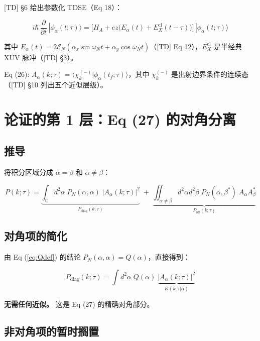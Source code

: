 \documentclass[12pt,a4paper]{ctexart}
\begin{document}
[TD] §6 给出参数化 TDSE（Eq 18）：

\begin{equation}\label{eq:paramTDSE}
i\hbar\,\frac{\partial}{\partial t}\,|\phi_\alpha(t;\tau)\rangle
= \bigl[H_A + ez\bigl(E_\alpha(t) + E_X^{\text{cl}}(t-\tau)\bigr)\bigr]\,|\phi_\alpha(t;\tau)\rangle
\end{equation}

其中 $E_\alpha(t) = 2\mathcal{E}_N(\alpha_x\sin\omega_N t + \alpha_y\cos\omega_N t)$（[TD] Eq 12），$E_X^{\text{cl}}$ 是半经典 XUV 脉冲（[TD] §3）。

Eq (26): $A_\alpha(k;\tau) = \langle\chi_k^{(-)}|\phi_\alpha(t_f;\tau)\rangle$，其中 $\chi_k^{(-)}$ 是出射边界条件的连续态（[TD] §10 列出五个近似层级）。

\section{论证的第 1 层：Eq (27) 的对角分离}

\subsection{推导}

将积分区域分成 $\alpha=\beta$ 和 $\alpha\neq\beta$：

\begin{equation}\label{eq:split}
P(k;\tau) = \underbrace{\int_{\mathbb{C}} d^2\alpha\;P_N(\alpha,\alpha)\;|A_\alpha(k;\tau)|^2}_{P_{\text{diag}}(k;\tau)}
\;+\;
\underbrace{\iint_{\alpha\neq\beta} d^2\alpha d^2\beta\;P_N(\alpha,\beta^*)\;A_\alpha A_\beta^*}_{P_{\text{off}}(k;\tau)}
\end{equation}

\subsection{对角项的简化}

由 Eq (\ref{eq:Qdef}) 的结论 $P_N(\alpha,\alpha) = Q(\alpha)$，直接得到：

\begin{equation}\label{eq:diag}
\boxed{P_{\text{diag}}(k;\tau) = \int d^2\alpha\; Q(\alpha)\; \underbrace{|A_\alpha(k;\tau)|^2}_{K(k,\tau|\alpha)}}
\end{equation}

\textbf{无需任何近似。} 这是 Eq (27) 的精确对角部分。

\subsection{非对角项的暂时搁置}
\end{document}
